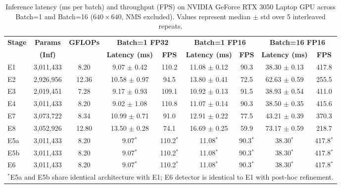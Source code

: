 \begin{table}[t]
\centering
\caption{Inference latency (ms per batch) and throughput (FPS) on NVIDIA GeForce RTX 3050 Laptop GPU across Batch=1 and Batch=16 ($640\times640$, NMS excluded). Values represent median $\pm$ std over 5 interleaved repeats.}
\label{tab:compute_complexity_rigorous}
\small
\begin{tabular}{l c c c c c c c c}
\hline
\textbf{Stage} & \textbf{Params} & \textbf{GFLOPs} & \multicolumn{2}{c}{\textbf{Batch=1 FP32}} & \multicolumn{2}{c}{\textbf{Batch=1 FP16}} & \multicolumn{2}{c}{\textbf{Batch=16 FP16}} \\
 & \textbf{(Inf)} & & \textbf{Latency (ms)} & \textbf{FPS} & \textbf{Latency (ms)} & \textbf{FPS} & \textbf{Latency (ms)} & \textbf{FPS} \\
\hline
E1 & 3,011,433 & 8.20 & 9.07 $\pm$ 0.42 & 110.2 & 11.08 $\pm$ 0.12 & 90.3 & 38.30 $\pm$ 0.13 & 417.8 \\
E2 & 2,926,956 & 12.36 & 10.58 $\pm$ 0.97 & 94.5 & 13.80 $\pm$ 0.41 & 72.5 & 62.63 $\pm$ 0.59 & 255.5 \\
E3 & 2,019,451 & 7.28 & 9.17 $\pm$ 0.93 & 109.1 & 10.92 $\pm$ 0.13 & 91.5 & 38.93 $\pm$ 0.54 & 411.0 \\
E4 & 3,011,433 & 8.20 & 9.02 $\pm$ 1.08 & 110.8 & 11.07 $\pm$ 0.14 & 90.3 & 38.50 $\pm$ 0.35 & 415.6 \\
E7 & 3,073,722 & 8.34 & 10.99 $\pm$ 0.71 & 91.0 & 12.91 $\pm$ 0.22 & 77.5 & 43.21 $\pm$ 0.39 & 370.3 \\
E8 & 3,052,926 & 12.80 & 13.50 $\pm$ 0.28 & 74.1 & 16.69 $\pm$ 0.25 & 59.9 & 73.17 $\pm$ 0.59 & 218.7 \\
E5a & 3,011,433 & 8.20 & 9.07$^*$ & 110.2$^*$ & 11.08$^*$ & 90.3$^*$ & 38.30$^*$ & 417.8$^*$ \\
E5b & 3,011,433 & 8.20 & 9.07$^*$ & 110.2$^*$ & 11.08$^*$ & 90.3$^*$ & 38.30$^*$ & 417.8$^*$ \\
E6 & 3,011,433 & 8.20 & 9.07$^*$ & 110.2$^*$ & 11.08$^*$ & 90.3$^*$ & 38.30$^*$ & 417.8$^*$ \\
\hline
\multicolumn{9}{l}{\footnotesize $^*$E5a and E5b share identical architecture with E1; E6 detector is identical to E1 with post-hoc refinement.} \\
\end{tabular}
\end{table}
